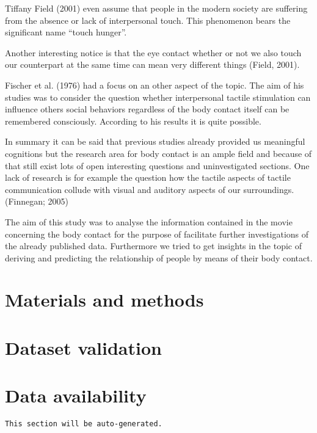 \documentclass[10pt,a4paper,twocolumn]{article}
\begin{document}
Tiffany Field (2001) even assume that people in the modern society are
suffering from the absence or lack of interpersonal touch. This phenomenon
bears the significant name “touch hunger”.

Another interesting notice is that the eye contact whether or not we also touch
our counterpart at the same time can mean very different  things (Field, 2001).

Fischer et al. (1976) had a focus on an other aspect of the topic. The aim of
his studies was to consider the question whether interpersonal tactile
stimulation can influence others social behaviors regardless of the body
contact itself can be remembered consciously. According to his results it is
quite possible.

In summary it can be said that previous studies already provided us meaningful
cognitions but the research area for body contact is an ample field and because
of that still exist lots of open interesting questions and uninvestigated
sections.  One lack of research is for example the question how the tactile
aspects of tactile communication collude with visual and auditory aspects of
our surroundings. (Finnegan; 2005)

The aim of this study was to analyse the information contained in the movie
concerning the body contact for the purpose of facilitate further
investigations of the already published data. Furthermore we tried to get
insights in the topic of deriving and predicting the relationship of people by
means of their body contact.


\section*{Materials and methods}


\section*{Dataset validation}


\section*{Data availability}

\texttt{This section will be auto-generated.}
\end{document}
